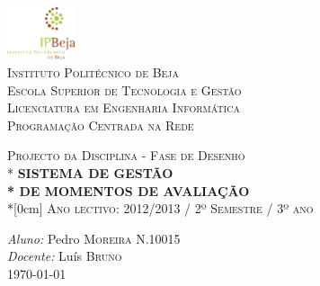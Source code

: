 \begin{titlepage}

\begin{center}

\includegraphics[width=0.15\textwidth]{logo.png}\\[1cm]    


\textsc{\LARGE Instituto Politécnico de Beja\\Escola Superior de Tecnologia e Gestão}\\[1.5cm]
\textsc{Licenciatura em Engenharia Informática}\\
\textsc{Programação Centrada na Rede}




\vspace*{\fill}
\textsc{Projecto da Disciplina - Fase de Desenho}\\*
{\huge \bfseries SISTEMA DE GESTÃO\\*
 \bfseries DE MOMENTOS DE AVALIAÇÃO}\\*[0cm]
\textsc{Ano lectivo: 2012/2013 / 2º Semestre / 3º ano}
\vspace*{\fill}


\vfill

{
\emph{Aluno:} Pedro \textsc{Moreira} N.10015\\



\emph{Docente:} Luís \textsc{Bruno}
\\

\large \today

}

\end{center}
\end{titlepage}
